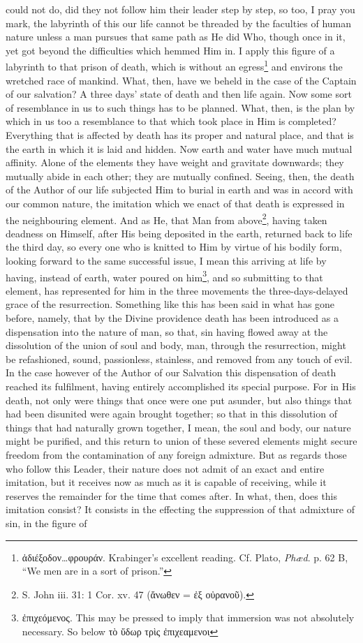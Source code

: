 could not do, did they not follow him their leader step by step, so too, I pray you mark, the labyrinth of this our life cannot be threaded by the faculties of human nature unless a man pursues that same path as He did Who, though once in it, yet got beyond the difficulties which hemmed Him in. I apply this figure of a labyrinth to that prison of death, which is without an egress\footnote{\textgreek{ἀδιέξοδον…φρουράν}. Krabinger’s excellent reading. Cf. Plato, \emph{Phæd}. p. 62 B, “We men are in a sort of prison.”} and environs the wretched race of mankind. What, then, have we beheld in the case of the Captain of our salvation? A three days’ state of death and then life again. Now some sort of resemblance in us to such things has to be planned. What, then, is the plan by which in us too a resemblance to that which took place in Him is completed? Everything that is affected by death has its proper and natural place, and that is the earth in which it is laid and hidden. Now earth and water have much mutual affinity. Alone of the elements they have weight and gravitate downwards; they mutually abide in each other; they are mutually confined. Seeing, then, the death of the Author of our life subjected Him to burial in earth and was in accord with our common nature, the imitation which we enact of that death is expressed in the neighbouring element. And as He, that Man from above\footnote{S. John iii. 31: 1 Cor. xv. 47 (\textgreek{ἄνωθεν = ἐξ οὐρανοῦ}).}, having taken deadness on Himself, after His being deposited in the earth, returned back to life the third day, so every one who is knitted to Him by virtue of his bodily form, looking forward to the same successful issue, I mean this arriving at life by having, instead of earth, water poured on him\footnote{\textgreek{ἐπιχεόμενος}. This may be pressed to imply that immersion was not absolutely necessary. So below \textgreek{τὸ ὕδωρ τρὶς ἐπιχεαμενοι}}, and so submitting to that element, has represented for him in the three movements the three-days-delayed grace of the resurrection. Something like this has been said in what has gone before, namely, that by the Divine providence death has been introduced as a dispensation into the nature of man, so that, sin having flowed away at the dissolution of the union of soul and body, man, through the resurrection, might be refashioned, sound, passionless, stainless, and removed from any touch of evil. In the case however of the Author of our Salvation this dispensation of death reached its fulfilment, having entirely accomplished its special purpose. For in His death, not only were things that once were one put asunder, but also things that had been disunited were again brought together; so that in this dissolution of things that had naturally grown together, I mean, the soul and body, our nature might be purified, and this return to union of these severed elements might secure freedom from the contamination of any foreign admixture. But as regards those who follow this Leader, their nature does not admit of an exact and entire imitation, but it receives now as much as it is capable of receiving, while it reserves the remainder for the time that comes after. In what, then, does this imitation consist? It consists in the effecting the suppression of that admixture of sin, in the figure of 
